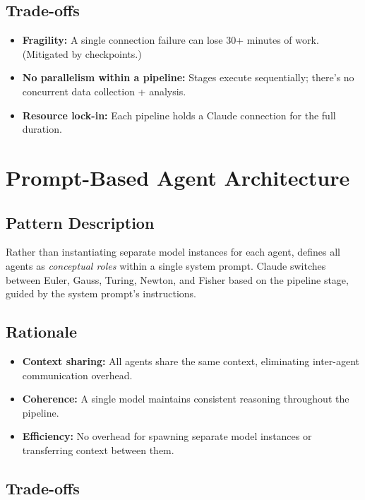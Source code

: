 \subsection{Trade-offs}

\begin{itemize}
  \item \textbf{Fragility:} A single connection failure can lose 30+ minutes of work. (Mitigated by checkpoints.)
  \item \textbf{No parallelism within a pipeline:} Stages execute sequentially; there's no concurrent data collection + analysis.
  \item \textbf{Resource lock-in:} Each pipeline holds a Claude connection for the full duration.
\end{itemize}

\section{Prompt-Based Agent Architecture}
\label{sec:patterns:prompt-agents}

\subsection{Pattern Description}

Rather than instantiating separate model instances for each agent, \autoscholar defines all agents as \emph{conceptual roles} within a single system prompt.
Claude switches between Euler, Gauss, Turing, Newton, and Fisher based on the pipeline stage, guided by the system prompt's instructions.

\subsection{Rationale}

\begin{itemize}
  \item \textbf{Context sharing:} All agents share the same context, eliminating inter-agent communication overhead.
  \item \textbf{Coherence:} A single model maintains consistent reasoning throughout the pipeline.
  \item \textbf{Efficiency:} No overhead for spawning separate model instances or transferring context between them.
\end{itemize}

\subsection{Trade-offs}

